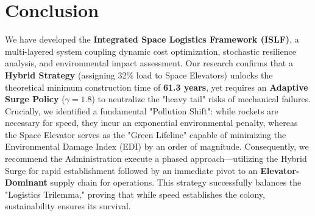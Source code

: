 \documentclass[11pt,letterpaper]{article}
\begin{document}
\section{Conclusion}
We have developed the \textbf{Integrated Space Logistics Framework (ISLF)}, a multi-layered system coupling dynamic cost optimization, stochastic resilience analysis, and environmental impact assessment. Our research confirms that a \textbf{Hybrid Strategy} (assigning 32\% load to Space Elevators) unlocks the theoretical minimum construction time of \textbf{61.3 years}, yet requires an \textbf{Adaptive Surge Policy} ($\gamma=1.8$) to neutralize the "heavy tail" risks of mechanical failures. Crucially, we identified a fundamental "Pollution Shift": while rockets are necessary for speed, they incur an exponential environmental penalty, whereas the Space Elevator serves as the "Green Lifeline" capable of minimizing the Environmental Damage Index (EDI) by an order of magnitude. Consequently, we recommend the Administration execute a phased approach—utilizing the Hybrid Surge for rapid establishment followed by an immediate pivot to an \textbf{Elevator-Dominant} supply chain for operations. This strategy successfully balances the "Logistics Trilemma," proving that while speed establishes the colony, sustainability ensures its survival.
\end{document}
